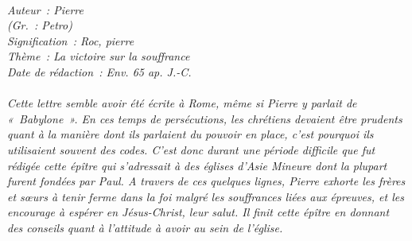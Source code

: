 \BFont
\noindent\hrulefill
{\footnotesize
\textit{
\bigskip
{\centering{}
\\Auteur~: Pierre
\\(Gr.~: Petro)
\\Signification~: Roc, pierre
\\Thème~: La victoire sur la souffrance
\\Date de rédaction~: Env. 65 ap. J.-C.\\}
}
\textit{
\\Cette lettre semble avoir été écrite à Rome, même si Pierre y parlait de «~Babylone~». En ces temps de persécutions, les chrétiens devaient être prudents quant à la manière dont ils parlaient du pouvoir en place, c'est pourquoi ils utilisaient souvent des codes. C'est donc durant une période difficile que fut rédigée cette épître qui s'adressait à des églises d'Asie Mineure dont la plupart furent fondées par Paul. A travers de ces quelques lignes, Pierre exhorte les frères et sœurs à tenir ferme dans la foi malgré les souffrances liées aux épreuves, et les encourage à espérer en Jésus-Christ, leur salut. Il finit cette épître en donnant des conseils quant à l'attitude à avoir au sein de l'église.\bigskip
}
}
\par\nobreak\noindent\hrulefill
